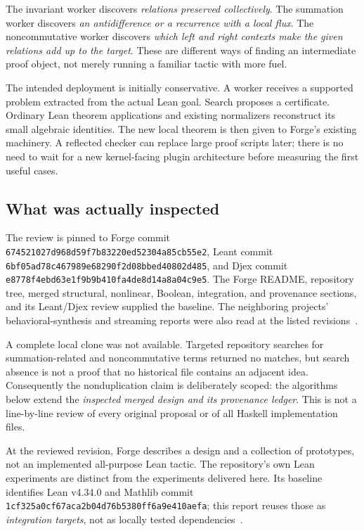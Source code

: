 \documentclass[11pt,letterpaper]{article}
\theoremstyle{definition}\newtheorem{definition}[theorem]{Definition}
\theoremstyle{remark}\newtheorem{remark}[theorem]{Remark}
\begin{document}
The invariant worker discovers \emph{relations preserved collectively}. The
summation worker discovers \emph{an antidifference or a recurrence with a local
flux}. The noncommutative worker discovers \emph{which left and right contexts
make the given relations add up to the target}. These are different ways of
finding an intermediate proof object, not merely running a familiar tactic with
more fuel.

The intended deployment is initially conservative. A worker receives a supported
problem extracted from the actual Lean goal. Search proposes a certificate.
Ordinary Lean theorem applications and existing normalizers reconstruct its
small algebraic identities. The new local theorem is then given to Forge's
existing machinery. A reflected checker can replace large proof scripts later;
there is no need to wait for a new kernel-facing plugin architecture before
measuring the first useful cases.

\subsection{What was actually inspected}
The review is pinned to Forge commit
\nolinkurl{674521027d968d59f7b83220ed52304a85cb55e2}, Leant commit
\nolinkurl{6bf05ad78c467989e68290f2d08bbed40802d485}, and Djex commit
\nolinkurl{e8778f4ebd63e1f9b9b410fa4de8d14a8a04c9e5}.
The Forge README, repository tree, merged structural, nonlinear, Boolean,
integration, and provenance sections, and its Leant/Djex review supplied the
baseline. The neighboring projects' behavioral-synthesis and streaming reports
were also read at the listed revisions~\cite{forge,forge-structural,forge-nonlinear,
forge-external,forge-integration,forge-provenance,leant-behavior,djex-stream}.

A complete local clone was not available. Targeted repository searches for
summation-related and noncommutative terms returned no matches, but search
absence is not a proof that no historical file contains an adjacent idea.
Consequently the nonduplication claim is deliberately scoped: the algorithms
below extend the \emph{inspected merged design and its provenance ledger}.
This is not a line-by-line review of every original proposal or of all Haskell
implementation files.

At the reviewed revision, Forge describes a design and a collection of
prototypes, not an implemented all-purpose Lean tactic. The repository's own
Lean experiments are distinct from the experiments delivered here. Its baseline
identifies Lean v4.34.0 and Mathlib commit
\nolinkurl{1cf325a0cf67aca2b04d76b5380ff6a9e410aefa}; this report reuses those as
\emph{integration targets}, not as locally tested dependencies~\cite{forge,
forge-integration}.
\end{document}
